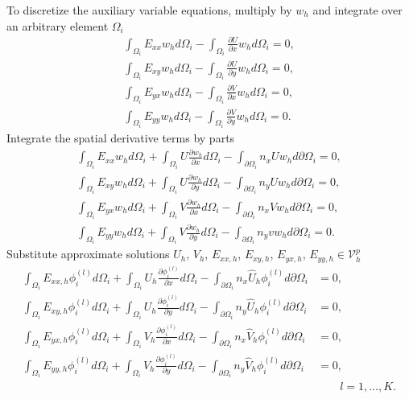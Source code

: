 \documentclass[11pt]{article}
\begin{document}
To discretize the auxiliary variable equations, multiply by $w_h$ and integrate over an arbitrary element $\Omega_i$
\begin{align}
\int_{\Omega_i}E_{xx} w_h d\Omega_i - \int_{\Omega_i}\frac{\partial U}{\partial x} w_h d\Omega_i= 0, \\
\int_{\Omega_i}E_{xy} w_h d\Omega_i - \int_{\Omega_i}\frac{\partial U}{\partial y} w_h d\Omega_i= 0, \\
\int_{\Omega_i}E_{yx} w_h d\Omega_i - \int_{\Omega_i}\frac{\partial V}{\partial x} w_h d\Omega_i= 0, \\
\int_{\Omega_i}E_{yy} w_h d\Omega_i - \int_{\Omega_i}\frac{\partial V}{\partial y} w_h d\Omega_i= 0.
\end{align}
Integrate the spatial derivative terms by parts
\begin{align}
\int_{\Omega_i}E_{xx} w_h d\Omega_i + \int_{\Omega_i} U \frac{\partial w_h}{\partial x} d\Omega_i - \int_{\partial\Omega_i}n_x Uw_h d\partial\Omega_i= 0, \\
\int_{\Omega_i}E_{xy} w_h d\Omega_i + \int_{\Omega_i} U \frac{\partial w_h}{\partial y} d\Omega_i - \int_{\partial\Omega_i}n_y Uw_h d\partial\Omega_i= 0, \\
\int_{\Omega_i}E_{yx} w_h d\Omega_i + \int_{\Omega_i} V \frac{\partial w_h}{\partial x} d\Omega_i - \int_{\partial\Omega_i}n_x Vw_h d\partial\Omega_i= 0, \\
\int_{\Omega_i}E_{yy} w_h d\Omega_i + \int_{\Omega_i} V \frac{\partial w_h}{\partial y} d\Omega_i - \int_{\partial\Omega_i}n_y vw_h d\partial\Omega_i= 0.
\end{align}
Substitute approximate solutions $U_h$, $V_h$, $E_{xx,h}$, $E_{xy,h}$, $E_{yx,h}$, $E_{yy,h}\in \mathcal{V}_h^p$
\begin{align}
\int_{\Omega_i}E_{xx,h} \phi_i^{(l)} d\Omega_i + \int_{\Omega_i} U_h \frac{\partial \phi_i^{(l)}}{\partial x} d\Omega_i - \int_{\partial\Omega_i}n_x \widehat{U}_h\phi_i^{(l)} d\partial\Omega_i&= 0, \\
\int_{\Omega_i}E_{xy,h} \phi_i^{(l)} d\Omega_i + \int_{\Omega_i} U_h \frac{\partial \phi_i^{(l)}}{\partial y} d\Omega_i - \int_{\partial\Omega_i}n_y \widehat{U}_h\phi_i^{(l)} d\partial\Omega_i&= 0, \\
\int_{\Omega_i}E_{yx,h} \phi_i^{(l)} d\Omega_i + \int_{\Omega_i} V_h \frac{\partial \phi_i^{(l)}}{\partial x} d\Omega_i - \int_{\partial\Omega_i}n_x \widehat{V}_h\phi_i^{(l)} d\partial\Omega_i&= 0, \\
\int_{\Omega_i}E_{yy,h} \phi_i^{(l)} d\Omega_i + \int_{\Omega_i} V_h \frac{\partial \phi_i^{(l)}}{\partial y} d\Omega_i - \int_{\partial\Omega_i}n_y \widehat{V}_h\phi_i^{(l)} d\partial\Omega_i&= 0, \\ &\quad\quad l = 1,\ldots,K. \nonumber
\end{align}
\end{document}
